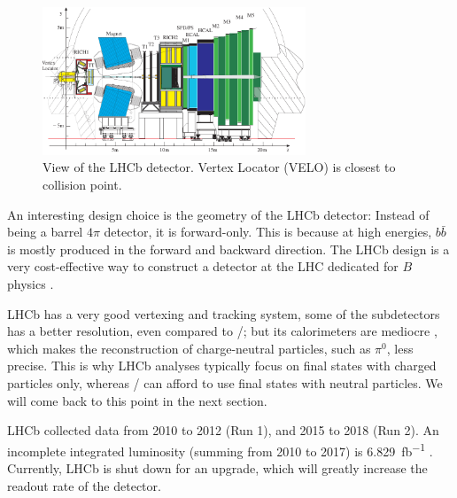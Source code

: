 \begin{figure}[ht]
    \centering
    \includegraphics[width=0.7\textwidth]{figs/lhcb_detector_view.pdf}
    \caption{
        View of the LHCb detector.
        Vertex Locator (VELO) is closest to collision point.
    }
    \label{fig:lhcb_detector_view}
\end{figure}

An interesting design choice is the geometry of the LHCb detector:
Instead of being a barrel $4\pi$ detector, it is forward-only.
This is because at high energies, $b\bar{b}$ is mostly produced in the forward
and backward direction.
The LHCb design is a very cost-effective way to construct a detector at the LHC
dedicated for $B$ physics \cite{LHCb:2008}.

LHCb has a very good vertexing and tracking system, some of the subdetectors has
a better resolution, even compared to \BaBar/;
but its calorimeters are mediocre \cite{LHCb:2008,Guz:2017}, which makes the
reconstruction of charge-neutral particles, such as $\pi^0$, less precise.
This is why LHCb analyses typically focus on final states with charged particles
only, whereas \BaBar/ can afford to use final states with neutral particles.
We will come back to this point in the next section.

LHCb collected data from 2010 to 2012 (Run 1), and 2015 to 2018 (Run 2).
An incomplete integrated luminosity (summing from 2010 to 2017) is
\SI{6.829}{fb^{-1}} \cite{LHCb-Facts:2019}.
Currently, LHCb is shut down for an upgrade, which will greatly increase the
readout rate of the detector.

